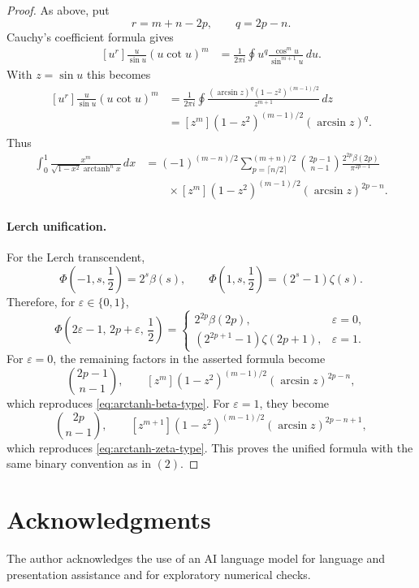 \documentclass[11pt,twoside]{article}
\numberwithin{equation}{section}
\begin{document}
\begin{proof}
As above, put
\[
r=m+n-2p,
\qquad
q=2p-n.
\]
Cauchy's coefficient formula gives
\[
\begin{aligned}
[u^r]
\frac{u}{\sin u}(u\cot u)^m
&=
\frac{1}{2\pi i}
\oint
u^q
\frac{\cos^m u}{\sin^{m+1}u}\,du.
\end{aligned}
\]
With $z=\sin u$ this becomes
\[
\begin{aligned}
[u^r]
\frac{u}{\sin u}(u\cot u)^m
&=
\frac{1}{2\pi i}
\oint
\frac{
(\arcsin z)^q
(1-z^2)^{(m-1)/2}
}{
z^{m+1}
}\,dz
\\
&=
[z^m]
(1-z^2)^{(m-1)/2}
(\arcsin z)^q.
\end{aligned}
\]
Thus
\begin{equation}
\label{eq:arctanh-beta-type}
\boxed{
\begin{aligned}
\int_0^1
\frac{x^m}
{\sqrt{1-x^2}\operatorname{arctanh}^n x}\,dx
&=
(-1)^{(m-n)/2}
\sum_{p=\lceil n/2\rceil}^{(m+n)/2}
\binom{2p-1}{n-1}
\frac{2^{2p}\beta(2p)}
{\pi^{2p-1}}
\\
&\qquad\times
[z^m]
(1-z^2)^{(m-1)/2}
(\arcsin z)^{2p-n}.
\end{aligned}
}
\end{equation}

\paragraph{Lerch unification.}
For the Lerch transcendent,
\[
\Phi\!\left(-1,s,\frac12\right)=2^s\beta(s),
\qquad
\Phi\!\left(1,s,\frac12\right)=(2^s-1)\zeta(s).
\]
Therefore, for \(\varepsilon\in\{0,1\}\),
\[
\Phi\!\left(
2\varepsilon-1,\,
2p+\varepsilon,\,
\frac12
\right)
=
\begin{cases}
2^{2p}\beta(2p),&\varepsilon=0,\\[1mm]
(2^{2p+1}-1)\zeta(2p+1),&\varepsilon=1.
\end{cases}
\]
For \(\varepsilon=0\), the remaining factors in the asserted formula
become
\[
\binom{2p-1}{n-1},\qquad
[z^m](1-z^2)^{(m-1)/2}(\arcsin z)^{2p-n},
\]
which reproduces \eqref{eq:arctanh-beta-type}.  For
\(\varepsilon=1\), they become
\[
\binom{2p}{n-1},\qquad
[z^{m+1}](1-z^2)^{(m-1)/2}(\arcsin z)^{2p-n+1},
\]
which reproduces \eqref{eq:arctanh-zeta-type}.  This proves the unified
formula with the same binary convention as in \((2)\).
\end{proof}

\section*{Acknowledgments}


The author acknowledges the use of an AI language model for language and presentation assistance and for exploratory numerical checks.


\printbibliography
\end{document}
